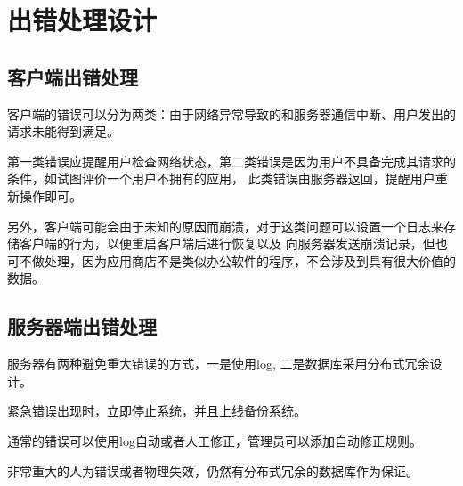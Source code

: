 \chapter{出错处理设计}

\section{客户端出错处理}
客户端的错误可以分为两类：由于网络异常导致的和服务器通信中断、用户发出的请求未能得到满足。

第一类错误应提醒用户检查网络状态，第二类错误是因为用户不具备完成其请求的条件，如试图评价一个用户不拥有的应用，
此类错误由服务器返回，提醒用户重新操作即可。

另外，客户端可能会由于未知的原因而崩溃，对于这类问题可以设置一个日志来存储客户端的行为，以便重启客户端后进行恢复以及
向服务器发送崩溃记录，但也可不做处理，因为应用商店不是类似办公软件的程序，不会涉及到具有很大价值的数据。

\section{服务器端出错处理}
服务器有两种避免重大错误的方式，一是使用log, 二是数据库采用分布式冗余设计。

紧急错误出现时，立即停止系统，并且上线备份系统。

通常的错误可以使用log自动或者人工修正，管理员可以添加自动修正规则。

非常重大的人为错误或者物理失效，仍然有分布式冗余的数据库作为保证。
